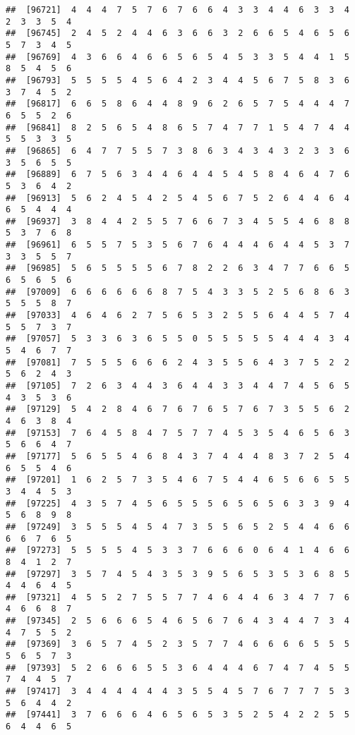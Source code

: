 \documentclass[
]{book}
\begin{document}
\begin{verbatim}
##  [96721]  4  4  4  7  5  7  6  7  6  6  4  3  3  4  4  6  3  3  4  2  3  3  5  4
##  [96745]  2  4  5  2  4  4  6  3  6  6  3  2  6  6  5  4  6  5  6  5  7  3  4  5
##  [96769]  4  3  6  6  4  6  6  5  6  5  4  5  3  3  5  4  4  1  5  8  5  4  5  6
##  [96793]  5  5  5  5  4  5  6  4  2  3  4  4  5  6  7  5  8  3  6  3  7  4  5  2
##  [96817]  6  6  5  8  6  4  4  8  9  6  2  6  5  7  5  4  4  4  7  6  5  5  2  6
##  [96841]  8  2  5  6  5  4  8  6  5  7  4  7  7  1  5  4  7  4  4  5  5  3  3  5
##  [96865]  6  4  7  7  5  5  7  3  8  6  3  4  3  4  3  2  3  3  6  3  5  6  5  5
##  [96889]  6  7  5  6  3  4  4  6  4  4  5  4  5  8  4  6  4  7  6  5  3  6  4  2
##  [96913]  5  6  2  4  5  4  2  5  4  5  6  7  5  2  6  4  4  6  4  6  5  4  4  4
##  [96937]  3  8  4  4  2  5  5  7  6  6  7  3  4  5  5  4  6  8  8  5  3  7  6  8
##  [96961]  6  5  5  7  5  3  5  6  7  6  4  4  4  6  4  4  5  3  7  3  3  5  5  7
##  [96985]  5  6  5  5  5  5  6  7  8  2  2  6  3  4  7  7  6  6  5  6  5  6  5  6
##  [97009]  6  6  6  6  6  6  8  7  5  4  3  3  5  2  5  6  8  6  3  5  5  5  8  7
##  [97033]  4  6  4  6  2  7  5  6  5  3  2  5  5  6  4  4  5  7  4  5  5  7  3  7
##  [97057]  5  3  3  6  3  6  5  5  0  5  5  5  5  5  4  4  4  3  4  5  4  6  7  7
##  [97081]  7  5  5  5  6  6  6  2  4  3  5  5  6  4  3  7  5  2  2  5  6  2  4  3
##  [97105]  7  2  6  3  4  4  3  6  4  4  3  3  4  4  7  4  5  6  5  4  3  5  3  6
##  [97129]  5  4  2  8  4  6  7  6  7  6  5  7  6  7  3  5  5  6  2  4  6  3  8  4
##  [97153]  7  6  4  5  8  4  7  5  7  7  4  5  3  5  4  6  5  6  3  5  6  6  4  7
##  [97177]  5  6  5  5  4  6  8  4  3  7  4  4  4  8  3  7  2  5  4  6  5  5  4  6
##  [97201]  1  6  2  5  7  3  5  4  6  7  5  4  4  6  5  6  6  5  5  3  4  4  5  3
##  [97225]  4  3  5  7  4  5  6  5  5  5  6  5  6  5  6  3  3  9  4  5  6  8  9  8
##  [97249]  3  5  5  5  4  5  4  7  3  5  5  6  5  2  5  4  4  6  6  6  6  7  6  5
##  [97273]  5  5  5  5  4  5  3  3  7  6  6  6  0  6  4  1  4  6  6  8  4  1  2  7
##  [97297]  3  5  7  4  5  4  3  5  3  9  5  6  5  3  5  3  6  8  5  4  4  6  4  5
##  [97321]  4  5  5  2  7  5  5  7  7  4  6  4  4  6  3  4  7  7  6  4  6  6  8  7
##  [97345]  2  5  6  6  6  5  4  6  5  6  7  6  4  3  4  4  7  3  4  4  7  5  5  2
##  [97369]  3  6  5  7  4  5  2  3  5  7  7  4  6  6  6  6  5  5  5  5  6  5  7  3
##  [97393]  5  2  6  6  6  5  5  3  6  4  4  4  6  7  4  7  4  5  5  7  4  4  5  7
##  [97417]  3  4  4  4  4  4  4  3  5  5  4  5  7  6  7  7  7  5  3  5  6  4  4  2
##  [97441]  3  7  6  6  6  4  6  5  6  5  3  5  2  5  4  2  2  5  5  6  4  4  6  5

\end{verbatim}
\end{document}
